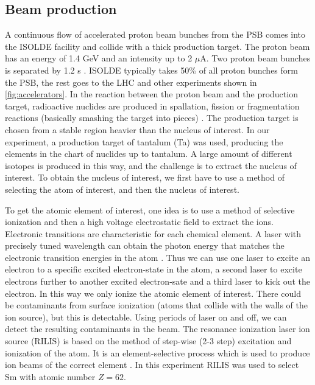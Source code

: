 \documentclass[twoside,english]{uiofysmaster/uiofysmaster}
\begin{document}
\subsection{Beam production}
A continuous flow of accelerated proton beam bunches from the PSB comes into the ISOLDE facility and collide with a thick production target. The proton beam has an energy of 1.4 GeV and an intensity up to 2 $\mu$A. Two proton beam bunches is separated by 1.2 s \cite{TIF, TIF2013}. ISOLDE typically takes 50\% \cite{MB-spect} of all proton bunches form the PSB, the rest goes to the LHC and other experiments shown in \autoref{fig:accelerators}. In the reaction between the proton beam and the production target, radioactive nuclides are produced in spallation, fission or fragmentation reactions (basically smashing the target into pieces) \cite{ISOLDE-web}. The production target is chosen from a stable region heavier than the nucleus of interest. In our experiment, a production target of tantalum (Ta) was used, producing the elements in the chart of nuclides up to tantalum. A large amount of different isotopes is produced in this way, and the challenge is to extract the nucleus of interest. To obtain the nucleus of interest, we first have to use a method of selecting the atom of interest, and then the nucleus of interest. 

To get the atomic element of interest, one idea is to use a method of selective ionization and then a high voltage electrostatic field to extract the ions. Electronic transitions are characteristic for each chemical element. A laser with precisely tuned wavelength can obtain the photon energy that matches the electronic transition energies in the atom \cite{RILIS-web, RILIS2013}. Thus we can use one laser to excite an electron to a specific excited electron-state in the atom, a second laser to excite electrons further to another excited electron-sate and a third laser to kick out the electron. In this way we only ionize the atomic element of interest. There could be contaminants from surface ionization (atoms that collide with the walls of the ion source), but this is detectable. Using periods of laser on and off, we can detect the resulting contaminants in the beam. The resonance ionization laser ion source (RILIS) is based on the method of step-wise (2-3 step) excitation and ionization of the atom. It is an element-selective process which is used to produce ion beams of the correct element \cite{RILIS}. In this experiment RILIS was used to select Sm with atomic number $Z = 62$. 
\end{document}
